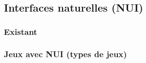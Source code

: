 	\subsection{Interfaces naturelles (NUI)}
		\subsubsection{Existant}
		
		\subsubsection{Jeux avec NUI (types de jeux)}